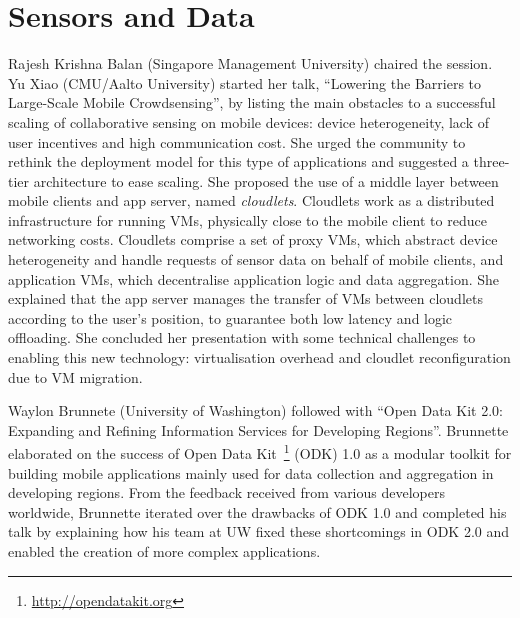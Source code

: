 \section{Sensors and Data}
\label{sec:sensors}

Rajesh Krishna Balan (Singapore Management University) chaired the
session. Yu Xiao (CMU/Aalto University) started her talk, ``Lowering the
Barriers to Large-Scale Mobile Crowdsensing'', by listing the main
obstacles to a successful scaling of collaborative sensing on mobile devices:
device heterogeneity, lack of user incentives and high communication
cost. She urged the community to rethink the deployment model for this
type of applications and suggested a three-tier architecture to ease
scaling. She proposed the use of a middle layer between mobile clients
and app server, named \emph{cloudlets}. Cloudlets work as a
distributed infrastructure for running VMs, physically close to the
mobile client to reduce networking costs. Cloudlets comprise a set of
proxy VMs, which abstract device heterogeneity and handle requests of
sensor data on behalf of mobile clients, and application VMs, which
decentralise application logic and data aggregation. She explained that
the app server manages the transfer of VMs between cloudlets according
to the user's position, to guarantee both low latency and logic
offloading. She concluded her presentation with some technical
challenges to enabling this new technology: virtualisation overhead and
cloudlet reconfiguration due to VM migration.

Waylon Brunnete (University of Washington) followed with ``Open Data Kit
2.0: Expanding and Refining Information Services for Developing
Regions''. Brunnette elaborated on the success of Open Data
Kit~\footnote{\url{http://opendatakit.org}} (ODK) 1.0 as a modular
toolkit for building mobile applications mainly used for data collection
and aggregation in developing regions. From the feedback received from
various developers worldwide, Brunnette iterated over the drawbacks of
ODK 1.0 and completed his talk by explaining how his team at UW fixed
these shortcomings in ODK 2.0 and enabled the creation of more complex
applications.


